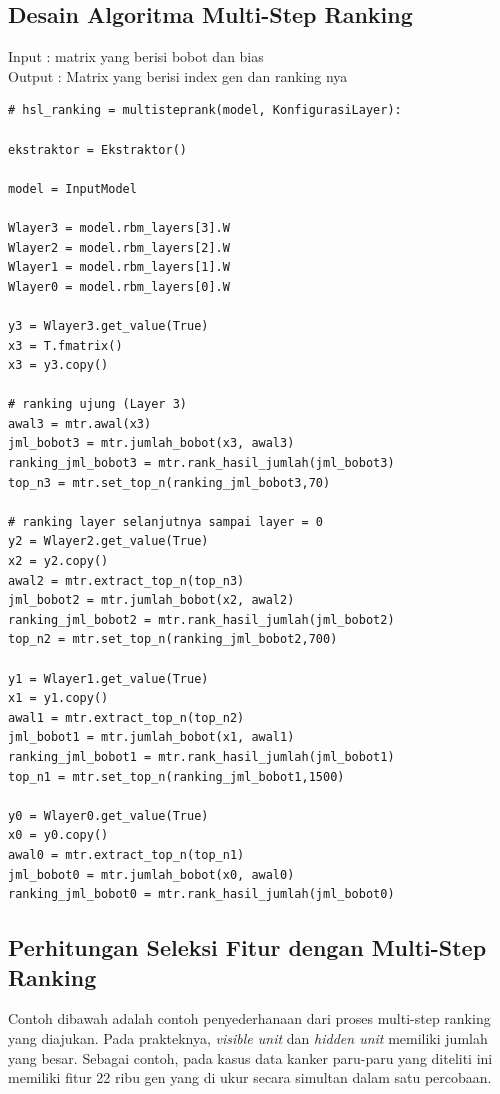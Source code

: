 \subsection{ Desain Algoritma Multi-Step Ranking }


Input : matrix yang berisi bobot dan bias \\
Output : Matrix yang berisi index gen dan ranking nya \\
\lstset{language=python}          %

\begin{lstlisting}
# hsl_ranking = multisteprank(model, KonfigurasiLayer):

ekstraktor = Ekstraktor()

model = InputModel

Wlayer3 = model.rbm_layers[3].W
Wlayer2 = model.rbm_layers[2].W
Wlayer1 = model.rbm_layers[1].W
Wlayer0 = model.rbm_layers[0].W

y3 = Wlayer3.get_value(True)
x3 = T.fmatrix()
x3 = y3.copy()

# ranking ujung (Layer 3)
awal3 = mtr.awal(x3)
jml_bobot3 = mtr.jumlah_bobot(x3, awal3)
ranking_jml_bobot3 = mtr.rank_hasil_jumlah(jml_bobot3)
top_n3 = mtr.set_top_n(ranking_jml_bobot3,70)

# ranking layer selanjutnya sampai layer = 0
y2 = Wlayer2.get_value(True)
x2 = y2.copy()
awal2 = mtr.extract_top_n(top_n3)
jml_bobot2 = mtr.jumlah_bobot(x2, awal2)
ranking_jml_bobot2 = mtr.rank_hasil_jumlah(jml_bobot2)
top_n2 = mtr.set_top_n(ranking_jml_bobot2,700)

y1 = Wlayer1.get_value(True)
x1 = y1.copy()
awal1 = mtr.extract_top_n(top_n2)
jml_bobot1 = mtr.jumlah_bobot(x1, awal1)
ranking_jml_bobot1 = mtr.rank_hasil_jumlah(jml_bobot1)
top_n1 = mtr.set_top_n(ranking_jml_bobot1,1500)

y0 = Wlayer0.get_value(True)
x0 = y0.copy()
awal0 = mtr.extract_top_n(top_n1)
jml_bobot0 = mtr.jumlah_bobot(x0, awal0)
ranking_jml_bobot0 = mtr.rank_hasil_jumlah(jml_bobot0)

\end{lstlisting}



\subsection{Perhitungan Seleksi Fitur dengan Multi-Step Ranking }

Contoh dibawah adalah contoh penyederhanaan dari proses multi-step ranking yang diajukan. Pada prakteknya, \textit{visible unit} dan \textit{hidden unit} memiliki jumlah yang besar. Sebagai contoh, pada kasus data kanker paru-paru yang diteliti ini memiliki fitur 22 ribu gen yang di ukur secara simultan dalam satu percobaan.

